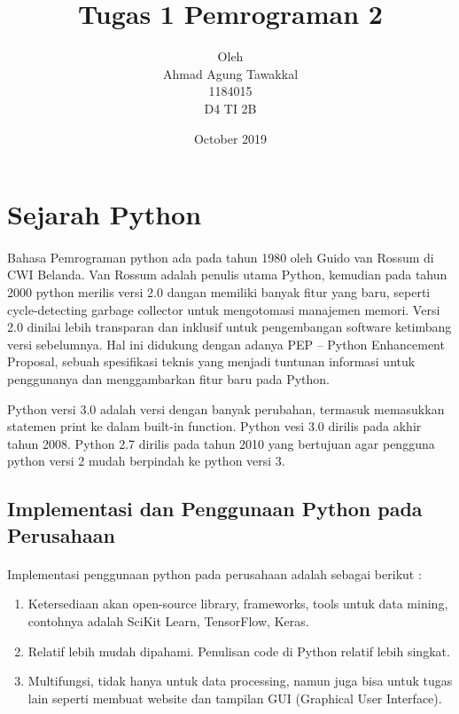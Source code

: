 \documentclass{article}
\title{Tugas 1 Pemrograman 2}
\author{Oleh\\Ahmad Agung Tawakkal\\
1184015\\
D4 TI 2B}
\date{October 2019}
\begin{document}
 
\maketitle

\newpage

\section {Sejarah Python}

    \paragraph{}Bahasa Pemrograman python ada pada tahun 1980 oleh Guido van Rossum di CWI Belanda. Van Rossum  adalah penulis utama Python, kemudian pada tahun 2000 python merilis versi 2.0 dangan memiliki banyak fitur yang baru, seperti cycle-detecting garbage collector untuk mengotomasi manajemen memori. Versi 2.0 dinilai lebih transparan dan inklusif untuk pengembangan software ketimbang versi sebelumnya. Hal ini didukung dengan adanya PEP – Python Enhancement Proposal, sebuah spesifikasi teknis yang menjadi tuntunan informasi untuk penggunanya dan menggambarkan fitur baru pada Python.\\
    
    \par Python versi 3.0 adalah versi dengan banyak perubahan, termasuk memasukkan statemen print ke dalam built-in function. Python vesi 3.0 dirilis pada akhir tahun 2008. Python 2.7 dirilis pada tahun 2010 yang bertujuan agar pengguna python versi 2 mudah berpindah ke python versi 3.\\
    
    \subsection{Implementasi dan Penggunaan Python pada Perusahaan}
        \paragraph{}Implementasi penggunaan python pada perusahaan adalah sebagai berikut :
            \begin{enumerate}
                \item Ketersediaan akan open-source library, frameworks, tools untuk data mining, contohnya adalah SciKit Learn, TensorFlow, Keras.
                \item Relatif lebih mudah dipahami. Penulisan code di Python relatif lebih singkat.
                 \item Multifungsi, tidak hanya untuk data processing, namun juga bisa untuk tugas lain seperti membuat website dan tampilan GUI (Graphical User Interface).
            \end{enumerate}
            
\end{document}

